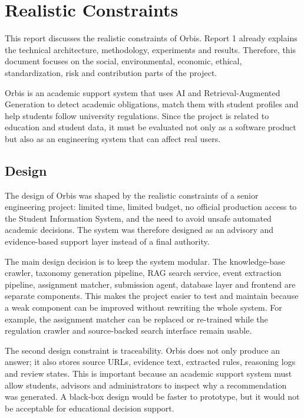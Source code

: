 \documentclass[a4paper,12pt]{article}
\begin{document}
\maketitle

{}
\maketableofcontents

\setcounter{page}{1}

\section{Realistic Constraints}
This report discusses the realistic constraints of Orbis. Report 1 already explains the technical architecture, methodology, experiments and results. Therefore, this document focuses on the social, environmental, economic, ethical, standardization, risk and contribution parts of the project.

Orbis is an academic support system that uses AI and Retrieval-Augmented Generation to detect academic obligations, match them with student profiles and help students follow university regulations. Since the project is related to education and student data, it must be evaluated not only as a software product but also as an engineering system that can affect real users.

\subsection{Design}
The design of Orbis was shaped by the realistic constraints of a senior engineering project: limited time, limited budget, no official production access to the Student Information System, and the need to avoid unsafe automated academic decisions. The system was therefore designed as an advisory and evidence-based support layer instead of a final authority.

The main design decision is to keep the system modular. The knowledge-base crawler, taxonomy generation pipeline, RAG search service, event extraction pipeline, assignment matcher, submission agent, database layer and frontend are separate components. This makes the project easier to test and maintain because a weak component can be improved without rewriting the whole system. For example, the assignment matcher can be replaced or re-trained while the regulation crawler and source-backed search interface remain usable.

The second design constraint is traceability. Orbis does not only produce an answer; it also stores source URLs, evidence text, extracted rules, reasoning logs and review states. This is important because an academic support system must allow students, advisors and administrators to inspect why a recommendation was generated. A black-box design would be faster to prototype, but it would not be acceptable for educational decision support.
\end{document}
